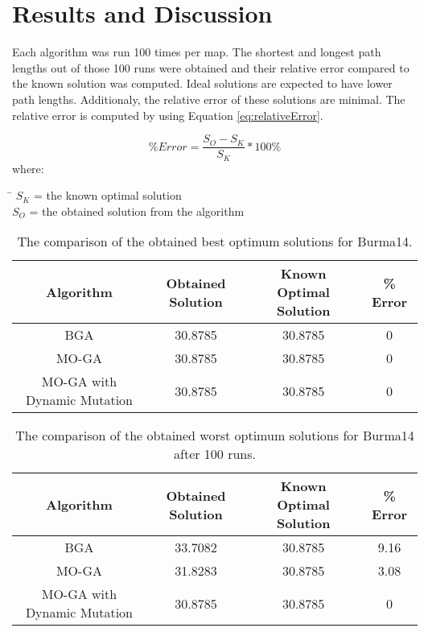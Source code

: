 \chapter{Results and Discussion}
\label{chap:Results and Discussion}
\indent \indent Each algorithm was run 100 times per map. The shortest and longest path lengths out of those 100 runs were obtained and their relative error compared to the known solution was computed. Ideal solutions are expected to have lower path lengths. Additionaly, the relative error of these solutions are minimal. The relative error is computed by using Equation \ref{eq:relativeError}.

\begin{equation}
	\label{eq:relativeError}
	\% Error = \frac{S_O - S_K}{S_K}  * 100\%
\end{equation}
where:
\begin{tabbing}
	\= \kill
	$S_K$ = the known optimal solution\\
	$S_O$\> = the obtained solution from the algorithm\\
\end{tabbing}

\begin{table*}[h]
	\begin{center}
		\begin{tabular}{ c c c c }
			Algorithm& Obtained Solution & Known Optimal Solution&\% Error\\ 
			\hline
			BGA & 30.8785 & 30.8785& 0  \\
			MO-GA & 30.8785 & 30.8785& 0  \\
			MO-GA with Dynamic Mutation & 30.8785& 30.8785 & 0 \\
		\end{tabular}
		\caption{The comparison of the obtained best optimum solutions for Burma14.}
		\label{table:Burma14OpSummary}
	\end{center}
\end{table*}

\begin{table*}[h]
	\begin{center}
		\begin{tabular}{ c c c c }
			Algorithm& Obtained Solution & Known Optimal Solution&\% Error\\ 
			\hline
			BGA & 33.7082 & 30.8785& 9.16  \\
			MO-GA & 31.8283 & 30.8785& 3.08  \\
			MO-GA with Dynamic Mutation & 30.8785 & 30.8785& 0 \\
		\end{tabular}
		\caption{The comparison of the obtained worst optimum solutions for Burma14 after 100 runs.}
		\label{table:Burma14WorstSummary}
	\end{center}
\end{table*}


